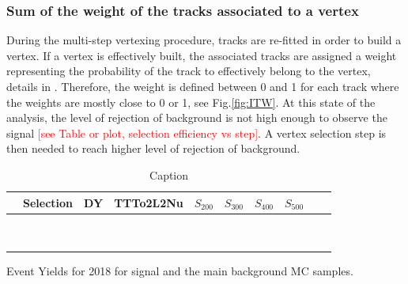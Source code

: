 \documentclass{cernatlasnote}
\begin{document}
\subsubsection{Sum of the weight of the tracks associated to a vertex}
\label{APP: MWT}
During the multi-step vertexing procedure, tracks are re-fitted in order to build a vertex. If a vertex is effectively built, the associated tracks are assigned a weight representing the probability of the track to effectively belong to the vertex, details in \cite{AVF}. Therefore, the weight is defined between 0 and 1 for each track where the weights are mostly close to 0 or 1, see Fig.\ref{fig:ITW}. 
At this state of the analysis, the level of rejection of background is not high enough to observe the signal \textcolor{red}{[see Table or plot, selection efficiency vs step]}. A vertex selection step is then needed to reach higher level of rejection of background. \\



\begin{table}
    \centering
    \begin{tabular}{ |c|c|c|c|c|c|c|c|c|c|}
    \hline
         & Selection & DY & TTTo2L2Nu & $S_{200}$ & $S_{300}$ & $S_{400}$ & $S_{500}$ \\
         \hline
         &  &  &  &  &  &  &   \\
         \hline
         &  &  &  &  &  &  &   \\
         \hline
         &  &  &  &  &  &  &  \\
         \hline
         &  &  &  &  &  &  &  \\
         \hline
         &  &  &  &  &  &  &  \\
         \hline
         &  &  &  &  &  &  &  \\
         \hline
         &  &  &  &  &  &  &   \\
         \hline
         &  &  &  &  &  &  &   \\
         \hline
         &  &  &  &  &  &  &   \\
    \hline
    \end{tabular}
    \caption{Caption}
    \label{tab:EVTYIELS2018} Event Yields for 2018 for signal and the main background MC samples.
\end{table}
\end{document}
